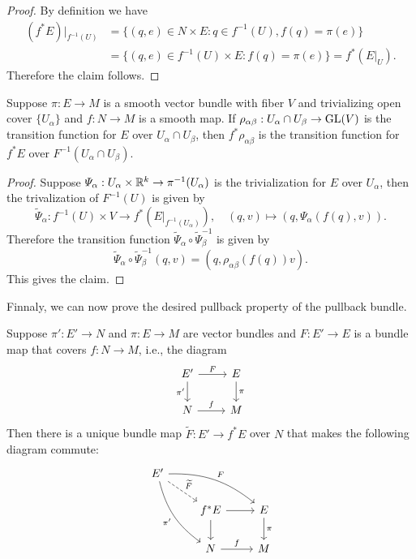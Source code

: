 \begin{proof}
By definition we have
\begin{align*}
(f^*E)|_{f^{-1}(U)}&=\{(q,e)\in N\times E:q\in f^{-1}(U),f(q)=\pi(e)\}\\
&=\{(q,e)\in f^{-1}(U)\times E:f(q)=\pi(e)\}=f^*(E|_U).
\end{align*}
Therefore the claim follows.
\end{proof}
\begin{proposition}
Suppose $\pi:E\to M$ is a smooth vector bundle with fiber $V$ and trivializing open cover $\{U_\alpha\}$ and $f:N\to M$ is a smooth map. If 
$\rho_{\alpha\beta}:U_\alpha\cap U_\beta\to\mathrm{GL}(V)$ is the transition function for $E$ over $U_\alpha\cap U_\beta$, then $f^*\rho_{\alpha\beta}$ is the transition 
function for $f^*E$ over $F^{-1}(U_\alpha\cap U_\beta)$.
\end{proposition}
\begin{proof}
Suppose $\varPsi_\alpha:U_\alpha\times\mathbb{R}^k\to\pi^{-1}(U_\alpha)$ is the trivialization for $E$ over $U_\alpha$, then the trivalization of $F^{-1}(U)$ is 
given by
\[\widetilde{\varPsi}_\alpha:f^{-1}(U)\times V\to f^*(E|_{f^{-1}(U_\alpha)}),\quad (q,v)\mapsto(q,\varPsi_\alpha(f(q),v)).\]
Therefore the transition function $\widetilde{\varPsi}_\alpha\circ\widetilde{\varPsi}_\beta^{-1}$ is given by
\[\widetilde{\varPsi}_\alpha\circ\widetilde{\varPsi}_\beta^{-1}(q,v)=(q,\rho_{\alpha\beta}(f(q))v).\]
This gives the claim.
\end{proof}
Finnaly, we can now prove the desired pullback property of the pullback bundle.
\begin{theorem}\label{vector bundle pullback universal prop}
Suppose $\pi':E'\to N$ and $\pi:E\to M$ are vector bundles and $F:E'\to E$ is a bundle map that covers $f:N\to M$, i.e., the diagram
\begin{equation}\label{vector bundle pullback universal-1}
\begin{tikzcd}
E'\ar[r,"F"]\ar[d,swap,"\pi'"]&E\ar[d,"\pi"]\\
N\ar[r,"f"]&M
\end{tikzcd}
\end{equation}
Then there is a unique bundle map 
$\widetilde{F}:E'\to f^*E$ over $N$ that makes the following diagram commute:
\begin{equation}\label{vector bundle pullback universal-2}
\begin{tikzcd}
E'\ar[rrd,bend left=20pt,"F"]\ar[rdd,bend right=20pt,swap,"\pi'"]\ar[rd,dashed,"\widetilde{F}"]&&\\
&f^*E\ar[d]\ar[r]&E\ar[d,"\pi"]\\
&N\ar[r,"f"]&M
\end{tikzcd}
\end{equation}
\end{theorem}
